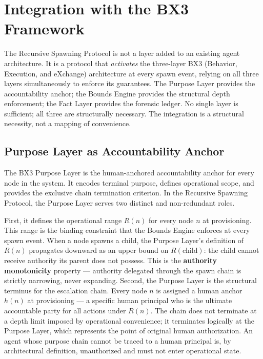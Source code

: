 
\section{Integration with the BX3 Framework}
\label{sec:bx3-integration}

The Recursive Spawning Protocol is not a layer added to an existing agent architecture. It is a protocol that \emph{activates} the three-layer BX3 (Behavior, Execution, and eXchange) architecture at every spawn event, relying on all three layers simultaneously to enforce its guarantees. The Purpose Layer provides the accountability anchor; the Bounds Engine provides the structural depth enforcement; the Fact Layer provides the forensic ledger. No single layer is sufficient; all three are structurally necessary. The integration is a structural necessity, not a mapping of convenience.

\subsection{Purpose Layer as Accountability Anchor}

The BX3 Purpose Layer is the human-anchored accountability anchor for every node in the system. It encodes terminal purpose, defines operational scope, and provides the exclusive chain termination criterion. In the Recursive Spawning Protocol, the Purpose Layer serves two distinct and non-redundant roles.

First, it defines the operational range $R(n)$ for every node $n$ at provisioning. This range is the binding constraint that the Bounds Engine enforces at every spawn event. When a node spawns a child, the Purpose Layer's definition of $R(n)$ propagates downward as an upper bound on $R(\text{child})$: the child cannot receive authority its parent does not possess. This is the \textbf{authority monotonicity} property --- authority delegated through the spawn chain is strictly narrowing, never expanding. Second, the Purpose Layer is the structural terminus for the escalation chain. Every node $n$ is assigned a human anchor $h(n)$ at provisioning --- a specific human principal who is the ultimate accountable party for all actions under $R(n)$. The chain does not terminate at a depth limit imposed by operational convenience; it terminates logically at the Purpose Layer, which represents the point of original human authorization. An agent whose purpose chain cannot be traced to a human principal is, by architectural definition, unauthorized and must not enter operational state.

